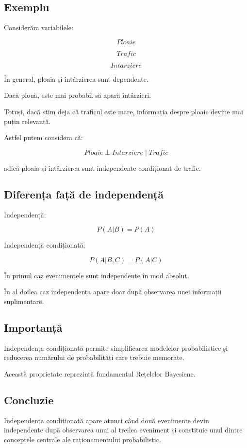 \documentclass[12pt,a4paper]{article}
\begin{document}
\subsection{Exemplu}

Considerăm variabilele:

\[
Ploaie
\]

\[
Trafic
\]

\[
Intarziere
\]

În general, ploaia și întârzierea sunt dependente.

Dacă plouă, este mai probabil să apară întârzieri.

Totuși, dacă știm deja că traficul este mare, informația despre ploaie devine mai puțin relevantă.

Astfel putem considera că:

\[
Ploaie
\perp
Intarziere
\mid
Trafic
\]

adică ploaia și întârzierea sunt independente condiționat de trafic.

\subsection{Diferența față de independență}

Independență:

\[
P(A|B)
=
P(A)
\]

Independență condiționată:

\[
P(A|B,C)
=
P(A|C)
\]

În primul caz evenimentele sunt independente în mod absolut.

În al doilea caz independența apare doar după observarea unei informații suplimentare.

\subsection{Importanță}

Independența condiționată permite simplificarea modelelor probabilistice și reducerea numărului de probabilități care trebuie memorate.

Această proprietate reprezintă fundamentul Rețelelor Bayesiene.

\subsection{Concluzie}

Independența condiționată apare atunci când două evenimente devin independente după observarea unui al treilea eveniment și constituie unul dintre conceptele centrale ale raționamentului probabilistic.
\end{document}
